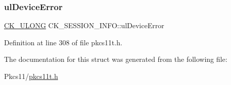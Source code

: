 \subsubsection{\texorpdfstring{ul\+Device\+Error}{ulDeviceError}}
{\footnotesize\ttfamily \hyperlink{pkcs11t_8h_a35181858a3b7a0a81f49d180d8f446ef}{C\+K\+\_\+\+U\+L\+O\+NG} C\+K\+\_\+\+S\+E\+S\+S\+I\+O\+N\+\_\+\+I\+N\+F\+O\+::ul\+Device\+Error}



Definition at line 308 of file pkcs11t.\+h.



The documentation for this struct was generated from the following file\+:\begin{DoxyCompactItemize}
\item 
Pkcs11/\hyperlink{pkcs11t_8h}{pkcs11t.\+h}\end{DoxyCompactItemize}
